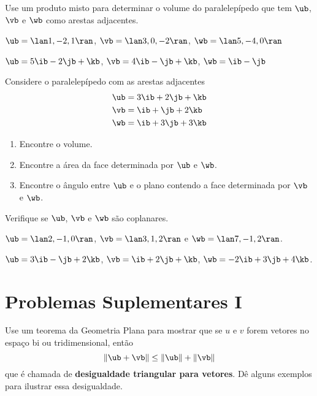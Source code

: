  \item [\textcolor{blue}{30-31}] Use um produto misto para determinar o volume do paralelepípedo que tem $\ub$, $\vb$ e $\wb$ como arestas adjacentes.
 
 \item $\ub = \lan 1, -2, 1\ran$, $\vb = \lan 3, 0, -2\ran$, $\wb = \lan 5, -4, 0\ran$
 
 \item $\ub = 5\ib - 2\jb + \kb$, $\vb = 4\ib - \jb + \kb$, $\wb = \ib - \jb$
 
 
\item Considere o paralelepípedo com as arestas adjacentes 
    \begin{align*}
    \ub &=3\ib + 2\jb + \kb\\
    \vb &= \ib + \jb+2\kb\\
    \wb &= \ib + 3\jb + 3\kb
    \end{align*}
\begin{enumerate}[leftmargin=*]
    \item Encontre o volume.
    \item Encontre a área da face determinada por $\ub$ e $\wb$.
    \item  Encontre o ângulo entre $\ub$ e o plano contendo a face determinada por $\vb$ e $\wb$.
\end{enumerate}

 \item[\textcolor{blue}{33-34}] Verifique se $\ub$, $\vb$ e  $\wb$ são coplanares.
  \item $\ub=\lan 2,-1,0\ran $, $\vb=\lan 3,1,2\ran$ e $\wb=\lan 7,-1,2\ran$.
  \item $\ub=3\ib -\jb + 2\kb$, $\vb= \ib +2\jb + \kb$, $\wb=-2\ib + 3\jb + 4\kb$.
  

\section{Problemas Suplementares I}

\item  Use um teorema da Geometria Plana para mostrar que se $u$ e $v$ forem vetores no espaço bi ou tridimensional, então 
$$\|\ub+\vb\|\leq \|\ub\| +\|\vb\|$$
que é chamada de \textbf{desigualdade triangular para vetores}. Dê alguns exemplos para ilustrar essa desigualdade.

